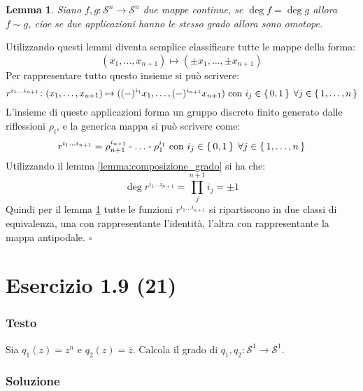 \documentclass[10pt, toc=sectionentrywithdots]{scrartcl}
\newcounter{lemmac}
\newtheorem{lemma}[lemmac]{Lemma}
\newcommand{\Sph}[1][]{\mathcal{S}^#1}
\let\latexcirc=\circ
\newcommand{\ccirc}{\mathbin{\mathchoice
  {\xcirc\scriptstyle}
  {\xcirc\scriptstyle}
  {\xcirc\scriptscriptstyle}
  {\xcirc\scriptscriptstyle}
}}
\newcommand{\xcirc}[1]{\vcenter{\hbox{$#1\latexcirc$}}}
\let\circ\ccirc
\begin{document}
\begin{lemma}
  \label{lemma:hopf}
  Siano $ f,g \colon \Sph{n} \to \Sph{n} $ due mappe continue, se
  $ \deg f = \deg g $ allora $ f \sim g $, cioe se due applicazioni
  hanno le stesso grado allora sono omotope.
\end{lemma}
\noindent
Utilizzando questi lemmi diventa %
semplice classificare tutte le mappe della forma:
\[
  (x_1, \dots, x_{n+1}) \mapsto (\pm x_1, \dots, \pm x_{n+1})
\]
Per rappresentare tutto questo insieme si può scrivere:
\[
   r^{i_1\dots i_{n+1}} \colon (x_1, \dots, x_{n+1}) \mapsto ( (-)^{i_1} x_1, \dots, (-)^{i_{n+1}} x_{n+1}) \text{ con } i_j \in \set{0,1} \; \forall j \in \set{1,\dots, n}
\]
L'insieme di queste applicazioni forma un gruppo discreto finito
generato dalle riflessioni $ \rho_i $, e la generica mappa si può
scrivere come:
\[
  r^{i_1\dots i_{n+1}} = \rho_{n+1}^{i_{n+1}} \circ \dots \circ \rho_{1}^{i_{1}} \text{ con } i_j \in \set{0,1} \; \forall j \in \set{1,\dots, n}
\]
Utilizzando il lemma \ref{lemma:composizione_grado} si ha che:
\[
  \deg r^{i_1\dots i_{n+1}} = \prod_j^{n+1} i_{j} = \pm 1
\]
Quindi per il lemma \ref{lemma:hopf} tutte le funzioni $ r^{i_1\dots i_{n+1}} $ si
ripartiscono in due classi di equivalenza, una con rappresentante l'identità,
l'altra con rappresentante la mappa antipodale. \hfill $ \square $

\section[1.9 (21)]{Esercizio 1.9 (21)}

\subsubsection*{Testo}

Sia $ q_1 (z) = z^n $ e $ q_2(z) = \bar{z} $. Calcola il grado di $ q_1, q_2 \colon \Sph{1} \to \Sph{1} $.

\subsubsection*{Soluzione}
\end{document}
